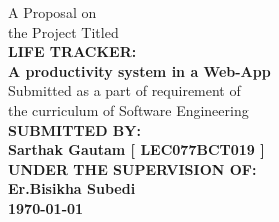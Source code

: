 \begin{center}
{\fontsize{14pt}{20}\selectfont A Proposal on \\ the Project Titled}\\
\vspace{1in}
{\fontsize{14pt}{20}\selectfont \textbf{LIFE TRACKER:\\ A productivity system in a Web-App}}\\
\vspace{1in}
{\fontsize{14pt}{20}\selectfont
Submitted as a part of requirement of \\the curriculum of
Software Engineering\\}
\vspace{1in}
    {\fontsize{14pt}{20}\selectfont \textbf{\MakeUppercase{Submitted by:}}}\\
    {\fontsize{14pt}{20}\selectfont \textbf{Sarthak Gautam [ LEC077BCT019 
    ]}}\\
\vspace{1in}
    {\fontsize{14pt}{20}\selectfont \textbf{\MakeUppercase{under the supervision of:}}}\\
    {\fontsize{14pt}{20}\selectfont \textbf{Er.Bisikha Subedi}}\\
\vspace{1in}
{\fontsize{14pt}{20}\selectfont \textbf{\today}}\\
\end{center}
\thispagestyle{empty}

